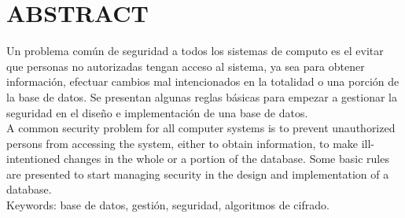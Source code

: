 \section{ABSTRACT}
Un problema común de seguridad a todos los sistemas de computo es el evitar que personas no autorizadas tengan acceso al sistema, ya sea para obtener información, efectuar cambios mal intencionados en la totalidad o una porción de la base de datos. Se presentan algunas reglas básicas para empezar a gestionar la seguridad en el diseño e implementación de una base de datos. \\

A common security problem for all computer systems is to prevent unauthorized persons from accessing the system, either to obtain information, to make ill-intentioned changes in the whole or a portion of the database. Some basic rules are presented to start managing security in the design and implementation of a database.\\

Keywords: base de datos, gestión, seguridad, algoritmos de cifrado.